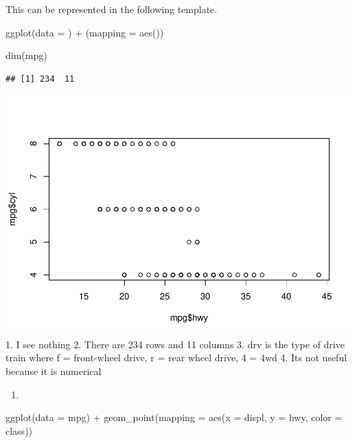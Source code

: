 \documentclass[
]{article}
\newenvironment{Shaded}{\begin{snugshade}}{\end{snugshade}}
\newcommand{\AttributeTok}[1]{\textcolor[rgb]{0.77,0.63,0.00}{#1}}
\newcommand{\FunctionTok}[1]{\textcolor[rgb]{0.00,0.00,0.00}{#1}}
\newcommand{\NormalTok}[1]{#1}
\newcommand{\SpecialCharTok}[1]{\textcolor[rgb]{0.00,0.00,0.00}{#1}}
\providecommand{\tightlist}{%
  \setlength{\itemsep}{0pt}\setlength{\parskip}{0pt}}
\begin{document}
This can be represented in the following template.

ggplot(data = ) + (mapping = aes())

\begin{Shaded}
\begin{Highlighting}[]
\FunctionTok{dim}\NormalTok{(mpg)}
\end{Highlighting}
\end{Shaded}

\begin{verbatim}
## [1] 234  11
\end{verbatim}

\begin{Shaded}
\end{Shaded}

\includegraphics{Journal_files/figure-latex/unnamed-chunk-38-1.pdf} 1. I
see nothing 2. There are 234 rows and 11 columns 3. drv is the type of
drive train where f = front-wheel drive, r = rear wheel drive, 4 = 4wd
4. Its not useful because it is numerical

\begin{enumerate}
\def\labelenumi{\arabic{enumi}.}
\setcounter{enumi}{3}
\tightlist
\item
\end{enumerate}

\begin{Shaded}
\begin{Highlighting}[]
\FunctionTok{ggplot}\NormalTok{(}\AttributeTok{data =}\NormalTok{ mpg) }\SpecialCharTok{+} 
  \FunctionTok{geom\_point}\NormalTok{(}\AttributeTok{mapping =} \FunctionTok{aes}\NormalTok{(}\AttributeTok{x =}\NormalTok{ displ, }\AttributeTok{y =}\NormalTok{ hwy, }\AttributeTok{color =}\NormalTok{ class))}
\end{Highlighting}
\end{Shaded}
\end{document}
